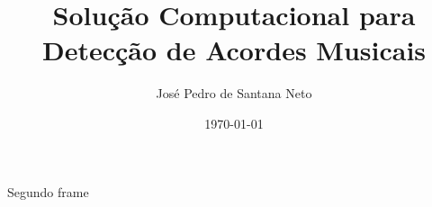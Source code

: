 \documentclass[aspectratio=169]{beamer}
\title[\sc{Detector de Acordes}]{Solução Computacional para Detecção de Acordes Musicais}
\author[José Pedro]{José Pedro de Santana Neto}
\institute{Universidade de Brasília - Faculdade do Gama} %
\date{\today}
\begin{document}
 
\begin{frame}
	  \titlepage
\end{frame}
	 
\begin{frame}
		Segundo frame
\end{frame}
	 
\end{document}
